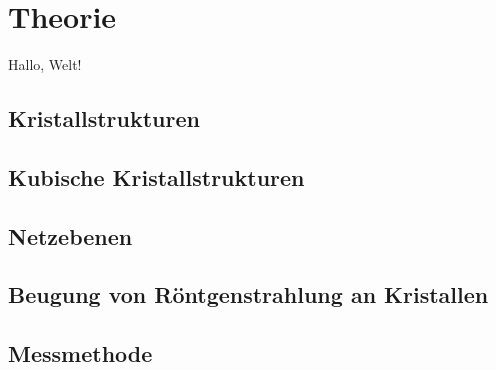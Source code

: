 \section{Theorie}\label{sec:Theorie}
Hallo, Welt!~\cite{sample}

\subsection{Kristallstrukturen}

\subsection{Kubische Kristallstrukturen}

\subsection{Netzebenen}

\subsection{Beugung von Röntgenstrahlung an Kristallen}

\subsection{Messmethode}

